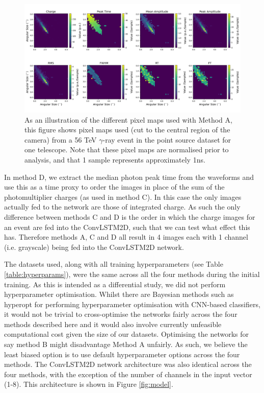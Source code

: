 \begin{figure}[ht]
  \centering
  \includegraphics[width=\textwidth]{figures/56tgamma.png}
  \caption{As an illustration of the different pixel maps used with Method A, this figure shows pixel maps used (cut to the central region of the camera) from a 56 TeV $\gamma$-ray event in the point source dataset for one telescope. Note that these pixel maps are normalised prior to analysis, and that 1 sample represents approximately 1ns.}
  \label{fig:wfplot}
\end{figure}
In method D, we extract the median photon peak time from the waveforms and use this as a time proxy to order the images in place of the sum of the photomultiplier charges (as used in method C). In this case the only images actually fed to the network are those of integrated charge. As such the only difference between methods C and D is the order in which the charge images for an event are fed into the ConvLSTM2D, such that we can test what effect this has. Therefore methods A, C and D all result in 4 images each with 1 channel (i.e. grayscale) being fed into the ConvLSTM2D network.

The datasets used, along with all training hyperparameters (see Table \ref{table:hyperparams}), were the same across all the four methods during the initial training. As this is intended as a differential study, we did not perform hyperparameter optimisation. Whilst there are Bayesian methods such as hyperopt \cite{hyperopt} for performing hyperparameter optimisation with CNN-based classifiers, it would not be trivial to cross-optimise the networks fairly across the four methods described here and it would also involve currently unfeasible computational cost given the size of our datasets. Optimising the networks for say method B might disadvantage Method A unfairly. As such, we believe the least biased option is to use default hyperparameter options across the four methods. The ConvLSTM2D network architecture was also identical across the four methods, with the exception of the number of channels in the input vector (1-8).  This architecture is shown in Figure \ref{fig:model}.

